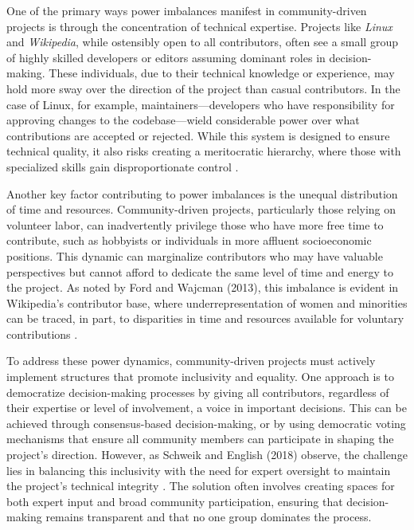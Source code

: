 \begin{refsection}
One of the primary ways power imbalances manifest in community-driven projects is through the concentration of technical expertise. Projects like \textit{Linux} and \textit{Wikipedia}, while ostensibly open to all contributors, often see a small group of highly skilled developers or editors assuming dominant roles in decision-making. These individuals, due to their technical knowledge or experience, may hold more sway over the direction of the project than casual contributors. In the case of Linux, for example, maintainers—developers who have responsibility for approving changes to the codebase—wield considerable power over what contributions are accepted or rejected. While this system is designed to ensure technical quality, it also risks creating a meritocratic hierarchy, where those with specialized skills gain disproportionate control \cite[pp.~154-157]{schweik2018}.

Another key factor contributing to power imbalances is the unequal distribution of time and resources. Community-driven projects, particularly those relying on volunteer labor, can inadvertently privilege those who have more free time to contribute, such as hobbyists or individuals in more affluent socioeconomic positions. This dynamic can marginalize contributors who may have valuable perspectives but cannot afford to dedicate the same level of time and energy to the project. As noted by Ford and Wajcman (2013), this imbalance is evident in Wikipedia’s contributor base, where underrepresentation of women and minorities can be traced, in part, to disparities in time and resources available for voluntary contributions \cite[pp.~45-47]{ford2013}. 

To address these power dynamics, community-driven projects must actively implement structures that promote inclusivity and equality. One approach is to democratize decision-making processes by giving all contributors, regardless of their expertise or level of involvement, a voice in important decisions. This can be achieved through consensus-based decision-making, or by using democratic voting mechanisms that ensure all community members can participate in shaping the project’s direction. However, as Schweik and English (2018) observe, the challenge lies in balancing this inclusivity with the need for expert oversight to maintain the project’s technical integrity \cite[pp.~112-115]{schweik2018}. The solution often involves creating spaces for both expert input and broad community participation, ensuring that decision-making remains transparent and that no one group dominates the process.


\end{refsection}
